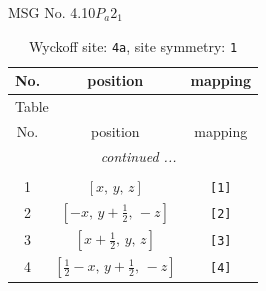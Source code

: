 \documentclass[fleqn,8pt]{jsarticle}
\begin{document}
\setcounter{MaxMatrixCols}{32}

\renewcommand{\tablename}{Table~}
\renewcommand{\figurename}{Figure~}
\begin{center}
\LARGE
MSG No. 4.10\quad$P_{a}2_{1}$
\end{center}
\renewcommand{\arraystretch}{1.2}
\begin{longtable}{ccc}
\caption{Wyckoff site: {\tt 4a}, site symmetry: {\tt 1}}
 \\
 \hline \hline
No. & position & mapping \\ \hline \endfirsthead

\multicolumn{2}{l}{\tablename\ \thetable{}} \\
 \hline \hline
No. & position & mapping \\ \hline \endhead

 \hline \hline
\multicolumn{2}{r}{\footnotesize\it continued ...} \\ \endfoot

 \hline \hline
\multicolumn{2}{r}{} \\ \endlastfoot

1 & $\left[ x,\, y,\, z \right]$ & {\tt [1]} \\ \hline
2 & $\left[ - x,\, y + \frac{1}{2},\, - z \right]$ & {\tt [2]} \\ \hline
3 & $\left[ x + \frac{1}{2},\, y,\, z \right]$ & {\tt [3]} \\ \hline
4 & $\left[ \frac{1}{2} - x,\, y + \frac{1}{2},\, - z \right]$ & {\tt [4]} \\
\end{longtable}
\end{document}
